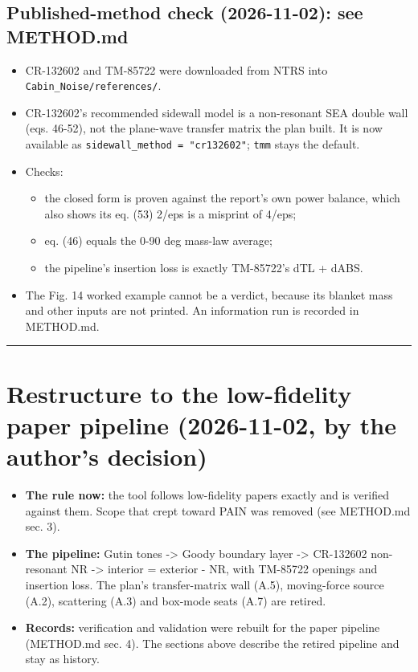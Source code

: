 \documentclass[10pt,a4paper]{article}
\begin{document}
\subsection*{Published-method check (2026-11-02): see METHOD.md}

\begin{itemize}
\item CR-132602 and TM-85722 were downloaded from NTRS into \texttt{Cabin\_\allowbreak{}Noise/\allowbreak{}references/\allowbreak{}}.
\item CR-132602's recommended sidewall model is a non-resonant SEA double wall (eqs. 46-52), not the plane-wave transfer matrix the plan built. It is now available as \texttt{sidewall\_\allowbreak{}method = "cr132602"}; \texttt{tmm} stays the default.
\item Checks:
\begin{itemize}
\item the closed form is proven against the report's own power balance, which also shows its eq. (53) 2/eps is a misprint of 4/eps;
\item eq. (46) equals the 0-90 deg mass-law average;
\item the pipeline's insertion loss is exactly TM-85722's dTL + dABS.
\end{itemize}
\item The Fig. 14 worked example cannot be a verdict, because its blanket mass and other inputs are not printed. An information run is recorded in METHOD.md.
\end{itemize}

\noindent\rule{\linewidth}{0.4pt}

\section*{Restructure to the low-fidelity paper pipeline (2026-11-02, by the author's decision)}

\begin{itemize}
\item \textbf{The rule now:} the tool follows low-fidelity papers exactly and is verified against them. Scope that crept toward PAIN was removed (see METHOD.md sec. 3).
\item \textbf{The pipeline:} Gutin tones -> Goody boundary layer -> CR-132602 non-resonant NR -> interior = exterior - NR, with TM-85722 openings and insertion loss. The plan's transfer-matrix wall (A.5), moving-force source (A.2), scattering (A.3) and box-mode seats (A.7) are retired.
\item \textbf{Records:} verification and validation were rebuilt for the paper pipeline (METHOD.md sec. 4). The sections above describe the retired pipeline and stay as history.
\end{itemize}
\end{document}
